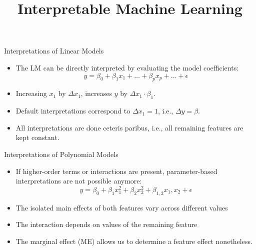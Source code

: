 \documentclass[11pt,compress,t,notes=noshow, xcolor=table]{beamer}
\title{Interpretable Machine Learning}
\institute{\href{https://compstat-lmu.github.io/lecture_iml/}{compstat-lmu.github.io/lecture\_iml}}
\date{}
\begin{document}


\newcommand{\titlefigure}{figure/me_movement}
\newcommand{\learninggoals}{
\item Why parameter-based interpretations are not always possible for parametric models
\item How marginal effects can be used in such cases
\item Drawbacks of marginal effects
\item Model-agnostic applicability}



\begin{vbframe}{Interpretations of Linear Models}

\begin{itemize}
\setlength\itemsep{2em}
\item The LM can be directly interpreted by evaluating the model coefficients:
\begin{equation*}
y = \beta_0 + \beta_1 x_1 + \dots + \beta_p x_p + \dots + \epsilon
\end{equation*}
\item Increasing $x_1$ by $\Delta x_1$, increases $y$ by $\Delta x_1 \cdot \beta_1$.
\item Default interpretations correspond to $\Delta x_1 = 1$, i.e., $\Delta y = \beta$. 
\item All interpretations are done ceteris paribus, i.e., all remaining features are kept constant.
\end{itemize}
\end{vbframe}

\begin{vbframe}{Interpretations of Polynomial Models}

\begin{itemize}
\setlength\itemsep{2em}
\item If higher-order terms or interactions are present, parameter-based interpretations are not possible anymore:
\begin{equation}
y = \beta_0 + \beta_{1} x_1^2 + \beta_{2} x_2^2 + \beta_{1, 2} x_1, x_2 + \epsilon
\label{eq:poly_model}
\end{equation}
\item The isolated main effects of both features vary across different values
\item The interaction depends on values of the remaining feature
\item The marginal effect (ME) allows us to determine a feature effect nonetheless. 
\end{itemize}

\end{vbframe}
\end{document}
